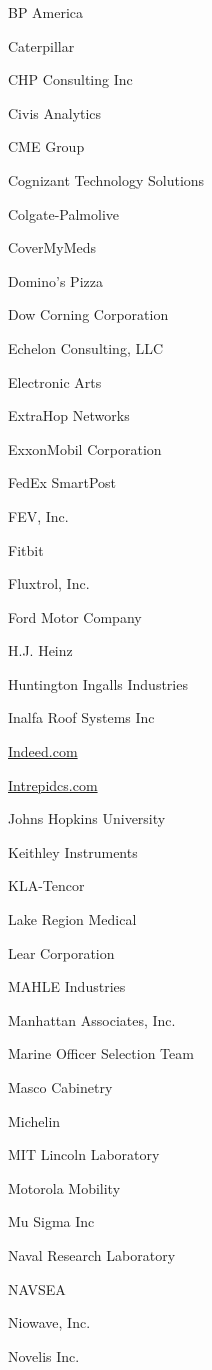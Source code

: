 \documentclass[twoside]{article}
\begin{document}
\begin{center}
\begin{multicols}{5}
\begin{FlushLeft}
\begin{compactitem}
\item BP America
\item Caterpillar
\item CHP Consulting Inc
\item Civis Analytics
\item CME Group
\item Cognizant Technology Solutions
\item Colgate-Palmolive
\item CoverMyMeds
\item Domino's Pizza
\item Dow Corning Corporation
\item Echelon Consulting, LLC
\item Electronic Arts
\item ExtraHop Networks
\item ExxonMobil Corporation
\item FedEx SmartPost
\item FEV, Inc.
\item Fitbit
\item Fluxtrol, Inc.
\item Ford Motor Company
\item H.J. Heinz
\item Huntington Ingalls Industries
\item Inalfa Roof Systems Inc
\item \url{Indeed.com}
\item \url{Intrepidcs.com}
\item Johns Hopkins University
\item Keithley Instruments
\item KLA-Tencor
\item Lake Region Medical
\item Lear Corporation
\item MAHLE Industries
\item Manhattan Associates, Inc.
\item Marine Officer Selection Team
\item Masco Cabinetry
\item Michelin
\item MIT Lincoln Laboratory
\item Motorola Mobility
\item Mu Sigma Inc
\item Naval Research Laboratory
\item NAVSEA
\item Niowave, Inc.
\item Novelis Inc.

\end{compactitem}
\end{FlushLeft}
\end{multicols}
\end{center}
\end{document}
